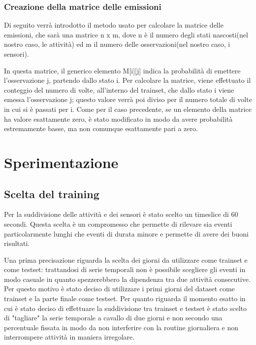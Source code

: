 \documentclass[10pt,a4paper]{article}
\begin{document}
	\subsubsection{Creazione della matrice delle emissioni}
	Di seguito verrà introdotto il metodo usato per calcolare la matrice delle emissioni, che sarà una matrice  n x m, dove n è il numero degli stati nascosti(nel nostro caso, le attività) ed m il numero delle osservazioni(nel nostro caso, i sensori).

	In questa matrice, il generico elemento M[i][j] indica la probabilità di emettere l'osservazione j, partendo dallo stato i. Per calcolare la matrice, viene effettuato il conteggio del numero di volte, all'interno del trainset, che dallo stato i viene emessa l'osservazione j; questo valore verrà poi diviso per il numero totale di volte in cui si è passati per i. Come per il caso precedente, se un elemento della matrice ha valore esattamente zero, è stato modificato in modo da avere probabilità estremamente basse, ma non comunque esattamente pari a zero.

	\section{Sperimentazione}

	\subsection{Scelta del training}

	Per la suddivisione delle attività e dei sensori è stato scelto un timeslice di 60 secondi. Questa scelta è un compromesso che permette di rilevare sia eventi particolarmente lunghi che eventi di durata minore e permette di avere dei buoni risultati.

	Una prima precisazione riguarda la scelta dei giorni da utilizzare come trainset e come testset: trattandosi di serie temporali non è possibile scegliere gli eventi in modo casuale in quanto spezzerebbero la dipendenza tra due attività consecutive. Per questo motivo è stato deciso di utilizzare i primi giorni del dataset come trainset e la parte finale come testset.
	Per quanto riguarda il momento esatto in cui è stato deciso di effettuare la suddivisione tra trainset e testset è stato scelto di "tagliare" la serie temporale a cavallo di due giorni e non secondo una percentuale fissata in modo da non interferire con la routine giornaliera e non interrompere attività in maniera irregolare.
\end{document}
